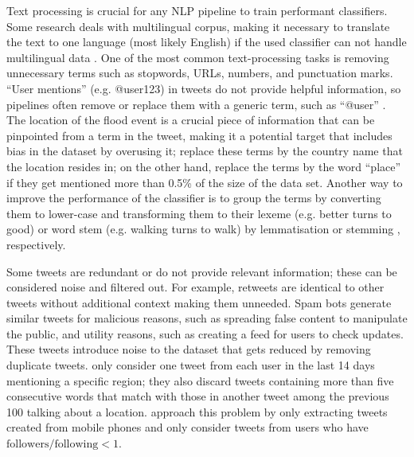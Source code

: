 Text processing is crucial for any \ac{NLP} pipeline to train performant classifiers. Some research
deals with multilingual corpus, making it necessary to translate the text to one language (most
likely English) if the used classifier can not handle multilingual data
\cite{singhEventClassificationLocation2019}. One of the most common text-processing tasks is
removing unnecessary terms such as stopwords, \ac{URL}s, numbers, and punctuation marks. ``User
mentions'' (e.g. @user123) in tweets do not provide helpful information, so pipelines often remove or
replace them with a generic term, such as ``@user'' \cite{debruijnImprovingClassificationFlood2020}.
The location of the flood event is a crucial piece of information that can be pinpointed from a term
in the tweet, making it a potential target that includes bias in the dataset by overusing it;
 replace these terms by the country name that
the location resides in; on the other hand, 
replace the terms by the word ``place'' if they get mentioned more than 0.5\% of the size of the
data set. Another way to improve the performance of the classifier is to group the terms by
converting them to lower-case and transforming them to their lexeme (e.g. better turns to good) or
word stem (e.g. walking turns to walk) by lemmatisation
\cite{petersenIdentificationExplorationExtreme2021} or stemming
\cite{fengExtractionPluvialFlood2018}, respectively.

 Some tweets are redundant or do not provide relevant information; these can be considered noise and
 filtered out. For example, retweets are identical to other tweets without additional context making
 them unneeded. Spam bots generate similar tweets for malicious reasons, such as spreading false
 content to manipulate the public, and utility reasons, such as creating a feed for users to check
 updates. These tweets introduce noise to the dataset that gets reduced by removing duplicate
 tweets.  only consider one tweet from each user in
 the last 14 days mentioning a specific region; they also discard tweets containing more than five
 consecutive words that match with those in another tweet among the previous 100 talking about a
 location.  approach this problem by only extracting
 tweets created from mobile phones and only consider tweets from users who have $\text{followers} /
 \text{following} < 1$.

